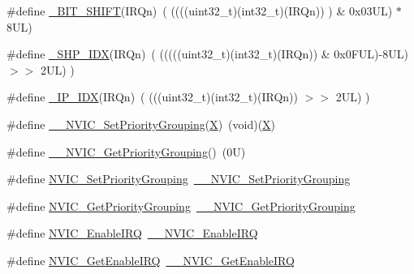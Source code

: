 \begin{DoxyCompactItemize}
\item 
\#define \hyperlink{group___c_m_s_i_s___core___n_v_i_c_functions_ga53c75b28823441c6153269f0ecbed878}{\+\_\+\+B\+I\+T\+\_\+\+S\+H\+I\+FT}(I\+R\+Qn)~(  ((((uint32\+\_\+t)(int32\+\_\+t)(I\+R\+Qn))         )      \&  0x03\+U\+L) $\ast$ 8\+U\+L)
\item 
\#define \hyperlink{group___c_m_s_i_s___core___n_v_i_c_functions_gaee4f7eb5d7e770ad51489dbceabb1755}{\+\_\+\+S\+H\+P\+\_\+\+I\+DX}(I\+R\+Qn)~( (((((uint32\+\_\+t)(int32\+\_\+t)(I\+R\+Qn)) \& 0x0\+F\+U\+L)-\/8\+U\+L) $>$$>$    2\+U\+L)      )
\item 
\#define \hyperlink{group___c_m_s_i_s___core___n_v_i_c_functions_ga370ec4b1751a6a889d849747df3763a9}{\+\_\+\+I\+P\+\_\+\+I\+DX}(I\+R\+Qn)~(   (((uint32\+\_\+t)(int32\+\_\+t)(I\+R\+Qn))                $>$$>$    2\+U\+L)      )
\item 
\#define \hyperlink{group___c_m_s_i_s___core___n_v_i_c_functions_ga6834dd8c9c59394f1b544b57665293a4}{\+\_\+\+\_\+\+N\+V\+I\+C\+\_\+\+Set\+Priority\+Grouping}(\hyperlink{main_8c_aa6aba27bc1a89db9e350b50bbf881f57}{X})~(void)(\hyperlink{main_8c_aa6aba27bc1a89db9e350b50bbf881f57}{X})
\item 
\#define \hyperlink{group___c_m_s_i_s___core___n_v_i_c_functions_gab2072fe50f6d7cd208f6768919f59fae}{\+\_\+\+\_\+\+N\+V\+I\+C\+\_\+\+Get\+Priority\+Grouping}()~(0\+U)
\item 
\#define \hyperlink{group___c_m_s_i_s___core___n_v_i_c_functions_ga0e798d5aec68cdd8263db86a76df788f}{N\+V\+I\+C\+\_\+\+Set\+Priority\+Grouping}~\hyperlink{group___c_m_s_i_s___core___n_v_i_c_functions_gafc94dcbaee03e4746ade1f5bb9aaa56d}{\+\_\+\+\_\+\+N\+V\+I\+C\+\_\+\+Set\+Priority\+Grouping}
\item 
\#define \hyperlink{group___c_m_s_i_s___core___n_v_i_c_functions_ga4eeb9214f2264fc23c34ad5de2d3fa11}{N\+V\+I\+C\+\_\+\+Get\+Priority\+Grouping}~\hyperlink{group___c_m_s_i_s___core___n_v_i_c_functions_ga9b894af672df4373eb637f8288845c05}{\+\_\+\+\_\+\+N\+V\+I\+C\+\_\+\+Get\+Priority\+Grouping}
\item 
\#define \hyperlink{group___c_m_s_i_s___core___n_v_i_c_functions_ga57b3064413dbc7459d9646020fdd8bef}{N\+V\+I\+C\+\_\+\+Enable\+I\+RQ}~\hyperlink{group___c_m_s_i_s___core___n_v_i_c_functions_ga71227e1376cde11eda03fcb62f1b33ea}{\+\_\+\+\_\+\+N\+V\+I\+C\+\_\+\+Enable\+I\+RQ}
\item 
\#define \hyperlink{group___c_m_s_i_s___core___n_v_i_c_functions_ga857de13232ec65dd15087eaa15bc4a69}{N\+V\+I\+C\+\_\+\+Get\+Enable\+I\+RQ}~\hyperlink{group___c_m_s_i_s___core___n_v_i_c_functions_gaaeb5e7cc0eaad4e2817272e7bf742083}{\+\_\+\+\_\+\+N\+V\+I\+C\+\_\+\+Get\+Enable\+I\+RQ}

\end{DoxyCompactItemize}
